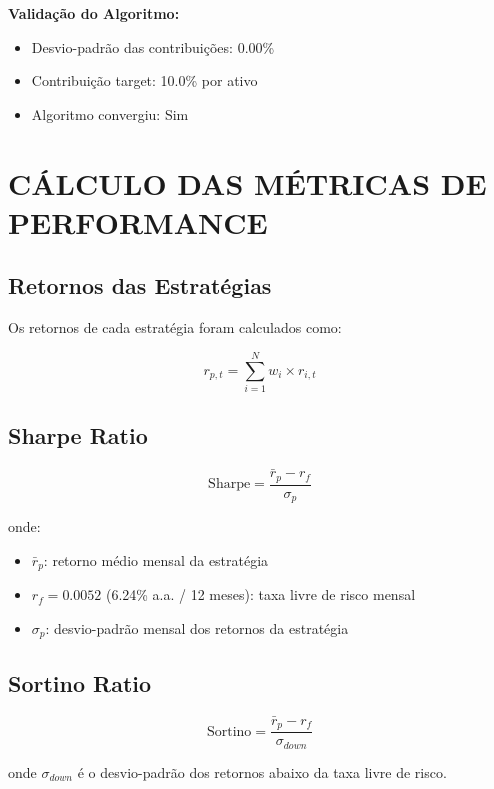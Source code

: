 \textbf{Validação do Algoritmo:}
\begin{itemize}
    \item Desvio-padrão das contribuições: 0.00\%
    \item Contribuição target: 10.0\% por ativo
    \item Algoritmo convergiu: Sim
\end{itemize}

\section{CÁLCULO DAS MÉTRICAS DE PERFORMANCE}

\subsection{Retornos das Estratégias}

Os retornos de cada estratégia foram calculados como:

\begin{equation}
r_{p,t} = \sum_{i=1}^{N} w_{i} \times r_{i,t}
\end{equation}

\subsection{Sharpe Ratio}

\begin{equation}
\text{Sharpe} = \frac{\bar{r}_p - r_f}{\sigma_p}
\end{equation}

onde:
\begin{itemize}
    \item $\bar{r}_p$: retorno médio mensal da estratégia
    \item $r_f = 0.0052$ (6.24\% a.a. / 12 meses): taxa livre de risco mensal
    \item $\sigma_p$: desvio-padrão mensal dos retornos da estratégia
\end{itemize}

\subsection{Sortino Ratio}

\begin{equation}
\text{Sortino} = \frac{\bar{r}_p - r_f}{\sigma_{down}}
\end{equation}

onde $\sigma_{down}$ é o desvio-padrão dos retornos abaixo da taxa livre de risco.

